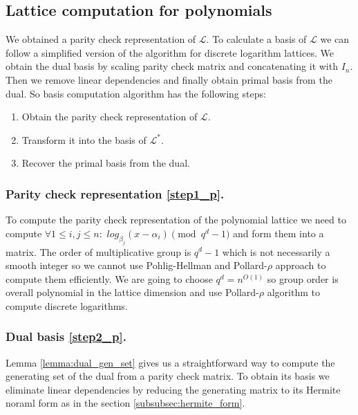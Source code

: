 \documentclass[12pt]{article}
\newcommand{\LL}{\mathcal{L}}
\begin{document}
\subsection{Lattice computation for polynomials}
\label{subsec:compute_basis_polynomials}


We obtained a parity check representation of $\LL$.
To calculate a basis of $\LL$ we can follow a simplified version of the algorithm for discrete logarithm lattices. We obtain the dual basis by scaling parity check matrix and concatenating it with $I_{n}$. Then we remove linear dependencies and finally obtain primal basis from the dual. So basis computation algorithm has the following steps:

\begin{enumerate}
    \item \label{step1_p} Obtain the parity check representation of $\LL$.
    \item \label{step2_p} Transform it into the basis of $\LL^{*}$.
    \item \label{step3_p} Recover the primal basis from the dual.
\end{enumerate}

\subsubsection{Parity check representation \ref{step1_p}.}
\label{subsubsec:parity_check_polynomials}
To compute the parity check representation of the polynomial lattice we need to compute
$\forall 1 \leq i,j \leq n :$ $log_{\beta_j}(x - \alpha_i) \pmod{q^{d} -1}$ and form them into a matrix. The order of multiplicative group is $q^{d} - 1$ which is not necessarily a smooth integer so we cannot use Pohlig-Hellman \cite{[PH78]} and Pollard-$\rho$ \cite{[Pol78]} approach to compute them efficiently. We are going to choose $q^{d} = n^{O(1)}$ so group order is overall polynomial in the lattice dimension and use Pollard-$\rho$ \cite{[Pol78]} algorithm to compute discrete logarithms.

\subsubsection{Dual basis \ref{step2_p}.}
\label{subsubsec:dual_gen_set_polynomials}

Lemma \ref{lemma:dual_gen_set} gives us a straightforward way to compute the generating set of the dual from a parity check matrix. To obtain its basis we eliminate linear dependencies by reducing the generating matrix to its Hermite noraml form as in the section \ref{subsubsec:hermite_form}.
\end{document}
